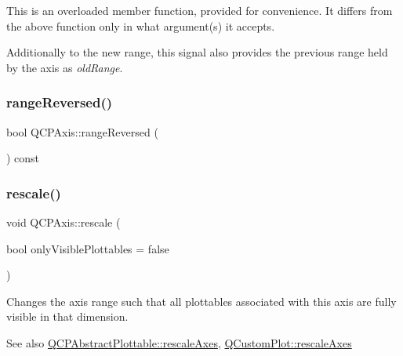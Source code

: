 This is an overloaded member function, provided for convenience. It differs from the above function only in what argument(s) it accepts.

Additionally to the new range, this signal also provides the previous range held by the axis as {\itshape old\+Range}. \mbox{\label{class_q_c_p_axis_ab9866dd1a78f1920f491ec12a794bec2}} 
\subsubsection{\texorpdfstring{range\+Reversed()}{rangeReversed()}}
{\footnotesize\ttfamily bool Q\+C\+P\+Axis\+::range\+Reversed (\begin{DoxyParamCaption}{ }\end{DoxyParamCaption}) const\hspace{0.3cm}{\ttfamily [inline]}}

\mbox{\label{class_q_c_p_axis_a499345f02ebce4b23d8ccec96e58daa9}} 
\subsubsection{\texorpdfstring{rescale()}{rescale()}}
{\footnotesize\ttfamily void Q\+C\+P\+Axis\+::rescale (\begin{DoxyParamCaption}\item[{bool}]{only\+Visible\+Plottables = {\ttfamily false} }\end{DoxyParamCaption})}

Changes the axis range such that all plottables associated with this axis are fully visible in that dimension.

\begin{DoxySeeAlso}{See also}
\hyperlink{class_q_c_p_abstract_plottable_a1491c4a606bccd2d09e65e11b79eb882}{Q\+C\+P\+Abstract\+Plottable\+::rescale\+Axes}, \hyperlink{class_q_custom_plot_ad86528f2cee6c7e446dea4a6e8839935}{Q\+Custom\+Plot\+::rescale\+Axes} 
\end{DoxySeeAlso}
\mbox{\label{class_q_c_p_axis_a31d18ddf3a4f21ceb077db8ae5b69856}} 
